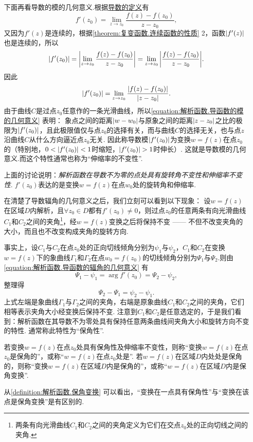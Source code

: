 下面再看导数的模的几何意义.根据\hyperref[equation:解析函数.导数的定义式]{导数的定义}有\[
f'(z_0) = \lim_{z \to z_0} \frac{f(z) - f(z_0)}{z - z_0},
\]又因为\(f'(z)\)是连续的，根据\cref{theorem:复变函数.连续函数的性质}  2，函数\(\abs{f'(z)}\)也是连续的，所以\[
\abs{f'(z_0)}
= \abs{ \lim_{z \to z_0} \frac{f(z) - f(z_0)}{z - z_0} }
= \lim_{z \to z_0} \abs{ \frac{f(z) - f(z_0)}{z - z_0} }.
\]因此\begin{equation}\label{equation:解析函数.导函数的模的几何意义}
\abs{f'(z_0)}
= \lim_{z \to z_0} \frac{\abs{f(z) - f(z_0)}}{\abs{z - z_0}}.
\end{equation}
由于曲线\(C\)是过点\(z_0\)任意作的一条光滑曲线，所以\cref{equation:解析函数.导函数的模的几何意义} 表明：
象点之间的距离\(\abs{w - w_0}\)与原象之间的距离\(\abs{z - z_0}\)之比的极限为\(\abs{f'(z_0)}\)，且此极限值仅与点\(z_0\)的选择有关，而与曲线\(C\)的选择无关，也与点\(z\)沿曲线\(C\)从什么方向逼近点\(z_0\)无关.
因此称导数模\(\abs{f'(z_0)}\)为变换\(w = f(z)\)在点\(z_0\)的（特别地，\(0 < \abs{f'(z_0)} < 1\)时缩短，\(\abs{f'(z_0)} > 1\)时伸长）.
这就是导数模的几何意义.而这个特性通常也称为“伸缩率的不变性”.

上面的讨论说明：\emph{解析函数在导数不为零的点处具有旋转角不变性和伸缩率不变性}.
\(f'(z_0)\)表达的是变换\(w = f(z)\)在点\(w_0\)处的旋转角和伸缩率.

在清楚了导数辐角的几何意义之后，我们立刻可以看到以下现象：
设\(w = f(z)\)在区域\(D\)内解析，且\(\forall z_0 \in D\)都有\(f'(z_0) \neq 0\)，则过点\(z_0\)的任意两条有向光滑曲线\(C_1\)和\(C_2\)之间的夹角\footnote{两条有向光滑曲线\(C_1\)和\(C_2\)之间的夹角定义为它们在交点\(z_0\)处的正向切线之间的夹角.}，经\(w = f(z)\)变换之后将保持不变 —— 不但不改变夹角的大小，而且也不改变构成夹角的旋转方向.

事实上，设\(C_1\)与\(C_2\)在点\(z_0\)处的正向切线倾角分别为\(\psi_1\)与\(\psi_2\)，\(C_1\)和\(C_2\)在变换\(w = f(z)\)下的象曲线\(\Gamma_1\)和\(\Gamma_2\)在点\(w_0 = f(z_0)\)的切线倾角分别为\(\Psi_1\)与\(\Psi_2\).则由\cref{equation:解析函数.导函数的辐角的几何意义} 有\[
\Psi_1 - \psi_1 = \arg f'(z_0) = \Psi_2 - \psi_2,
\]整理得\[
\Psi_2 - \Psi_1 = \psi_2 - \psi_1.
\]上式左端是象曲线\(\Gamma_1\)与\(\Gamma_2\)之间的夹角，右端是原象曲线\(C_1\)和\(C_2\)之间的夹角，它们相等表示夹角大小经变换后保持不变.
注意到\(C_1\)和\(C_2\)是任意选定的，于是我们看到：解析函数在其导数不为零处具有保持任意两条曲线间夹角大小和旋转方向不变的特性.
通常称此特性为“保角性”.

\begin{definition}\label{definition:解析函数.保角变换}
若变换\(w = f(z)\)在点\(z_0\)处具有保角性及伸缩率不变性，则称“变换\(w = f(z)\)在点\(z_0\)是保角的”，或称“\(w = f(z)\)在点\(z_0\)处是”.
若\(w = f(z)\)在区域\(D\)内处处是保角的，则称“变换\(w = f(z)\)在区域\(D\)内是保角的”，或称“\(w = f(z)\)在区域\(D\)内是保角变换”.
\end{definition}
从\cref{definition:解析函数.保角变换} 可以看出，“变换在一点具有保角性”与“变换在该点是保角变换”是有区别的.

